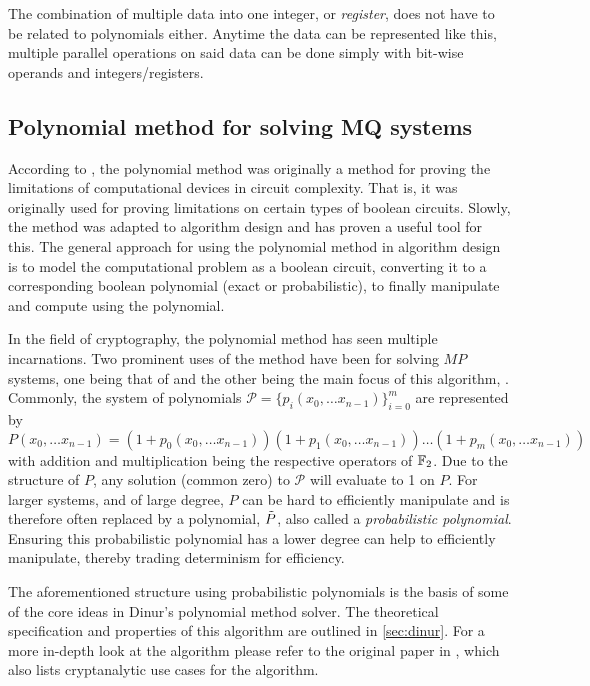 The combination of multiple data into one integer, or \textit{register}, does not have to be related to polynomials either. Anytime the data can be represented like this, multiple parallel operations on said data can be done simply with bit-wise operands and integers/registers.

\subsection{Polynomial method for solving MQ systems} \label{sec:prereq:polymethod}
According to \cite{Williams2014ThePM}, the polynomial method was originally a method for proving the limitations of computational devices in circuit complexity. That is, it was originally used for proving limitations on certain types of boolean circuits. Slowly, the method was adapted to algorithm design and has proven a useful tool for this. The general approach for using the polynomial method in algorithm design is to model the computational problem as a boolean circuit, converting it to a corresponding boolean polynomial (exact or probabilistic), to finally manipulate and compute using the polynomial. 

In the field of cryptography, the polynomial method has seen multiple incarnations. Two prominent uses of the method have been for solving $MP$ systems, one being that of \cite{doi:10.1137/1.9781611974782.143} and the other being the main focus of this algorithm, \cite{eurocrypt-2021-30841}. Commonly, the system of polynomials $\mathcal{P} = \{p_i(x_0, \dots x_{n - 1})\}_{i = 0}^m$ are represented by 
$$
    P(x_0, \dots x_{n - 1}) = (1 + p_0(x_0, \dots x_{n - 1}))(1 + p_1(x_0, \dots x_{n - 1})) \dots (1 + p_m(x_0, \dots x_{n - 1}))
$$
with addition and multiplication being the respective operators of $\mathbb{F}_2$. Due to the structure of $P$, any solution (common zero) to $\mathcal{P}$ will evaluate to 1 on $P$. For larger systems, and of large degree, $P$ can be hard to efficiently manipulate and is therefore often replaced by a polynomial, $\Tilde{P}$, also called a \textit{probabilistic polynomial}. Ensuring this probabilistic polynomial has a lower degree can help to efficiently manipulate, thereby trading determinism for efficiency.

The aforementioned structure using probabilistic polynomials is the basis of some of the core ideas in Dinur's polynomial method solver. The theoretical specification and properties of this algorithm are outlined in \cref{sec:dinur}. For a more in-depth look at the algorithm please refer to the original paper in \cite{eurocrypt-2021-30841}, which also lists cryptanalytic use cases for the algorithm.


